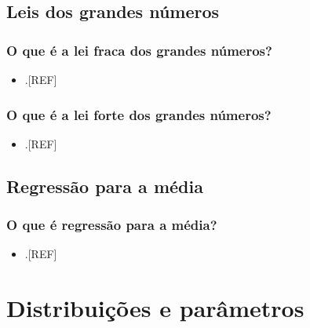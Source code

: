 \documentclass[
]{book}
\providecommand{\tightlist}{%
  \setlength{\itemsep}{0pt}\setlength{\parskip}{0pt}}
\begin{document}
\hypertarget{lei-grandes-numeros}{%
\section{Leis dos grandes números}\label{lei-grandes-numeros}}

\hypertarget{o-que-uxe9-a-lei-fraca-dos-grandes-nuxfameros}{%
\subsection{O que é a lei fraca dos grandes números?}\label{o-que-uxe9-a-lei-fraca-dos-grandes-nuxfameros}}

\begin{itemize}
\tightlist
\item
  .{[}REF{]}
\end{itemize}

\hypertarget{o-que-uxe9-a-lei-forte-dos-grandes-nuxfameros}{%
\subsection{O que é a lei forte dos grandes números?}\label{o-que-uxe9-a-lei-forte-dos-grandes-nuxfameros}}

\begin{itemize}
\tightlist
\item
  .{[}REF{]}
\end{itemize}

\hypertarget{regressao-media}{%
\section{Regressão para a média}\label{regressao-media}}

\hypertarget{o-que-uxe9-regressuxe3o-para-a-muxe9dia}{%
\subsection{O que é regressão para a média?}\label{o-que-uxe9-regressuxe3o-para-a-muxe9dia}}

\begin{itemize}
\tightlist
\item
  .{[}REF{]}
\end{itemize}

\hypertarget{distribuicoes-parametros}{%
\chapter{\texorpdfstring{\textbf{Distribuições e parâmetros}}{Distribuições e parâmetros}}\label{distribuicoes-parametros}}
\end{document}
